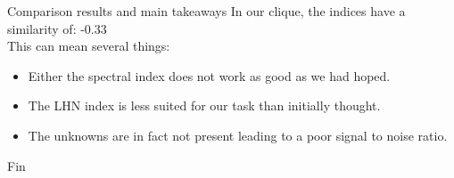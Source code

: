 \documentclass{beamer}
\begin{document}
\begin{frame}{Comparison results and main takeaways}
    In our clique, the indices have a similarity of: -0.33 \in[-1,1]\\
    \vspace{0.5cm}
    This can mean several things:\\
    \begin{itemize}
        \item Either the spectral index does not work as good as we had hoped.\\
        \item The LHN index is less suited for our task than initially thought.\\
        \item The unknowns are in fact not present leading to a poor signal to noise ratio.\\
    \end{itemize}
\end{frame}

\begin{frame}{Fin}
\quad \quad \quad {}
\end{frame}
\end{document}
